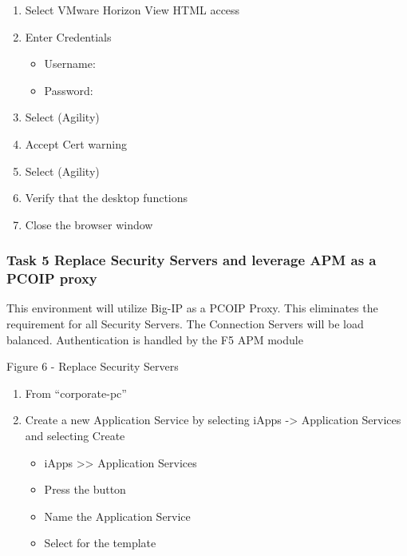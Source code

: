 \documentclass[letterpaper,10pt,english]{sphinxmanual}
\begin{document}
\begin{enumerate}
\item {} 
Select VMware Horizon View HTML access

\item {} 
Enter Credentials
\begin{itemize}
\item {} 
Username: 

\item {} 
Password: 

\end{itemize}

\item {} 
Select (Agility)

\item {} 
Accept Cert warning

\item {} 
Select (Agility)

\item {} 
Verify that the desktop functions

\item {} 
Close the browser window

\end{enumerate}


\subsubsection{Task 5 \textendash{} Replace Security Servers and leverage APM as a PCOIP proxy}
\label{\detokenize{class2/module1/lab1:task-5-replace-security-servers-and-leverage-apm-as-a-pcoip-proxy}}
This environment will utilize Big-IP as a PCOIP Proxy. This eliminates
the requirement for all Security Servers. The Connection Servers will be
load balanced. Authentication is handled by the F5 APM module


Figure 6 - Replace Security Servers

\begin{enumerate}
\item {} 
From “corporate-pc”

\item {} 
Create a new Application Service by selecting iApps -\textgreater{} Application
Services and selecting Create
\begin{itemize}
\item {} 
iApps \textgreater{}\textgreater{} Application Services

\item {} 
Press the  button

\item {} 
Name the Application Service 

\item {} 
Select  for the template

\end{itemize}

\end{enumerate}
\end{document}
